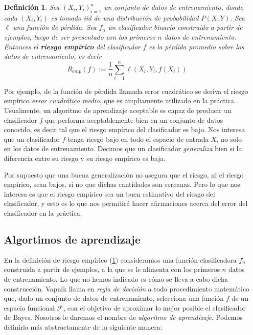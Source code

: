 \documentclass{report}
\newtheorem{dfn}{Definición}[section]
\begin{document}
\begin{dfn} \label{dfn:riesgo_empirico}
    Sea $(X_i,Y_i)_{i=1}^n$ un conjunto de datos de entrenamiento, donde cada $(X_i,Y_i)$ es tomado iid de una distribución de probabilidad $P(X,Y)$. Sea
    $\ell$ una función de pérdida. Sea $f_n$ un clasificador binario construido a partir de ejemplos, luego
    de ser presentado con los primeros $n$ datos de entrenamiento.
    Entonces el \textbf{riesgo empírico} del clasificador $f$ es la pérdida promedio sobre los datos de entrenamiento, es decir
    \[
    R_{emp}(f) := \frac{1}{n} \sum_{i=1}^n \ell(X_i,Y_i,f(X_i))
    \]
\end{dfn}

Por ejemplo, de la función de pérdida llamada error cuadrático se deriva el riesgo empírico \textit{error cuadrático medio}, que es ampliamente
utilizado en la práctica. Usualmente, un algoritmo de aprendizaje aceptable es capaz de producir un clasificador $f$ que performa aceptablemente bien en un conjunto de datos
conocido, es decir tal que el riesgo empírico del clasificador es bajo. Nos interesa que un clasificador $f$ tenga riesgo bajo en todo el espacio
de entrada $X$, no solo en los datos de entrenamiento. Decimos que un clasificador \textit{generaliza} bien si la diferencia entre su riesgo
y su riesgo empírico es baja.

Por supuesto que una buena generalización no asegura que el riesgo, ni el riesgo empírico, sean bajos, si no que dichas cantidades son cercanas.
Pero lo que nos interesa es que el riesgo empírico sea un buen estimativo del riesgo del clasificador, y esto es lo que nos permitirá
hacer afirmaciones acerca del error del clasificador en la práctica.

\subsection{Algortimos de aprendizaje}

En la definición de riesgo empírico (\ref{dfn:riesgo_empirico}) consideramos una función clasificadora $f_n$ construida a partir
de ejemplos, a la que se le alimenta con los primeros $n$ datos de entrenamiento. Lo que no hemos indicado es cómo se lleva a cabo dicha construcción.
Vapnik llama en \cite{vapnik1995} \textit{regla de decisión } a todo procedimiento matemático que, dado un conjunto de datos de entrenamiento, selecciona una función
$f$ de un espacio funcional $\mathcal{F}$, con el objetivo de aproximar lo mejor posible el clasificador de Bayes. Nosotros le daremos el nombre de
\textit{algoritmo de aprendizaje}. Podemos definirlo más abstractamente de la siguiente manera:
\end{document}
